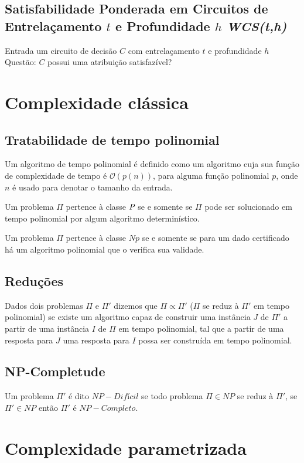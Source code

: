 \subsection{Satisfabilidade Ponderada em Circuitos de Entrelaçamento $t$ e Profundidade $h$ \emph{WCS(t,h)}}
\begin{definition}
 Entrada um circuito de decisão $C$ com entrelaçamento $t$ e profundidade $h$\\
 Questão: $C$ possui uma atribuição satisfazível?
\end{definition}

\section{Complexidade clássica}
\subsection{Tratabilidade de tempo polinomial}
Um algoritmo de tempo polinomial é definido como um algoritmo cuja sua função de complexidade de tempo é $\mathcal{O}(p(n))$, para alguma função polinomial $p$, onde $n$ é usado para denotar o tamanho da entrada.

Um problema $\Pi$ pertence à classe $\P$ se e somente se $\Pi$ pode ser solucionado em tempo polinomial por algum algoritmo determinístico.

Um problema $\Pi$ pertence à classe $\textit{Np}$ se e somente se para um dado certificado há um algoritmo polinomial que o verifica sua validade.

\subsection{Reduções}
Dados dois problemas $\Pi$ e $\Pi'$ dizemos que $\Pi \propto \Pi'$ ($\Pi$ se reduz à $\Pi'$ em tempo polinomial) se existe um algoritmo capaz de construir uma instância $J$ de $\Pi'$ a partir de uma instância $I$ de $\Pi$ em tempo polinomial, tal que a partir de uma resposta para $J$ uma resposta para $I$ possa ser construída em tempo polinomial. 

\subsection{NP-Completude}
Um problema $\Pi'$ é dito $NP-Difícil$ se todo problema $\Pi \in NP$ se reduz à $\Pi'$, se $\Pi' \in NP$ então $\Pi'$ é $NP-Completo$.

\section{Complexidade parametrizada}

